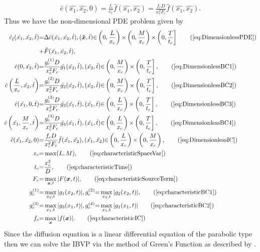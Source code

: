\documentclass[\main/thesis.tex]{subfiles}
\begin{document}
\begin{align}
\hat{c}(\hat{x_1}, \hat{x_2}, 0) {=} \frac{f_c}{c_c} \hat{f}(\hat{x_1}, \hat{x_2})
                                                {=} \frac{f_c D}{x_c^2 F_c} \hat{f}(\hat{x_1}, \hat{x_2}).
\label{eq:DimensionlessIC}
\end{align}
Thus we have the non-dimensional PDE problem given by
\begin{align*}
\hat{c}_{\hat{t}}(\hat{x_1}, \hat{x_2}, \hat{t}) 
&{=} \Delta \hat{c}(\hat{x_1}, \hat{x_2}, \hat{t}), 
(\boldsymbol{\hat{x}}, \hat{t}) {\in} \left(0, \frac{L}{x_c}\right){\times}\left(0, \frac{M}{x_c}\right){\times}\left(0, \frac{T}{t_c}\right]
\tag{\ref{eq:DimensionlessPDE}}\\
&{+} \hat{F}(\hat{x_1}, \hat{x_2}, \hat{t}),\\
\hat{c}(0, \hat{x_2}, \hat{t})
&{=} \frac{g_c^{(1)} D}{x_c^2 F_c} \hat{g_1}(\hat{x_2}, \hat{t}),
(\hat{x_2}, \hat{t}) {\in} \left(0, \frac{M}{x_c}\right){\times}\left(0, \frac{T}{t_c}\right],
\tag{\ref{eq:DimensionlessBC1}}\\
\hat{c}\left(\frac{L}{x_c}, \hat{x_2}, \hat{t}\right)
&{=} \frac{g_c^{(2)} D}{x_c^2 F_c} \hat{g_2}(\hat{x_2}, \hat{t}),
(\hat{x_2}, \hat{t}) {\in} \left(0, \frac{M}{x_c}\right){\times}\left(0, \frac{T}{t_c}\right],
\tag{\ref{eq:DimensionlessBC2}}\\
\hat{c}(\hat{x_1}, 0, \hat{t}) 
&{=} \frac{g_c^{(3)} D}{x_c^2 F_c} \hat{g_3}(\hat{x_1}, \hat{t}),
(\hat{x_1}, \hat{t}) {\in} \left(0, \frac{L}{x_c}\right){\times}\left(0, \frac{T}{t_c}\right],
\tag{\ref{eq:DimensionlessBC3}}\\
\hat{c}\left(\hat{x_1}, \frac{M}{x_c}, \hat{t}\right)
&{=} \frac{g_c^{(4)} D}{x_c^2 F_c} \hat{g_4}(\hat{x_1}, \hat{t}),
(\hat{x_1}, \hat{t}) {\in} \left(0, \frac{L}{x_c}\right){\times}\left(0, \frac{T}{t_c}\right],
\tag{\ref{eq:DimensionlessBC4}}\\
\hat{c}(\hat{x_1}, \hat{x_2}, 0)
&{=} \frac{f_c D}{x_c^2 F_c} \hat{f}(\hat{x_1}, \hat{x_2}),
(\hat{x_1}, \hat{x_2}) {\in} \left(0, \frac{L}{x_c}\right){\times}\left(0, \frac{M}{x_c}\right),
\tag{\ref{eq:DimensionlessIC}}\\
x_c &{=} \max(L, M),
\tag{\ref{eq:characteristicSpaceVar}} \\
t_c &{=} \frac{x_c^2}{D},
\tag{\ref{eq:characteristicTime}}\\
F_c &{=} \max_{\boldsymbol{x}, t} | F(\boldsymbol{x}, t) |,
\tag{\ref{eq:characteristicSourceTerm}}\\
g_c^{(1)} &{=} \max_{x_2, t} | g_1(x_2, t) |, g_c^{(2)} {=} \max_{x_2, t} | g_2(x_2, t) |,
\tag{\ref{eq:characteristicBC1}}\\
g_c^{(3)} &{=} \max_{x_1, t} | g_3(x_1, t) |, g_c^{(4)} {=} \max_{x_1, t} | g_1(x_1, t) |
\tag{\ref{eq:characteristicBC2}}\\
f_c &{=} \max_{\boldsymbol{x}} | f(\boldsymbol{x}) |.
\tag{\ref{eq:characteristicIC}}
\end{align*}
Since the diffusion equation is a linear differential equation of the parabolic type then we can solve the IBVP via the method of Green's Function as described by \textcite{Polyanin}. 
\end{document}
